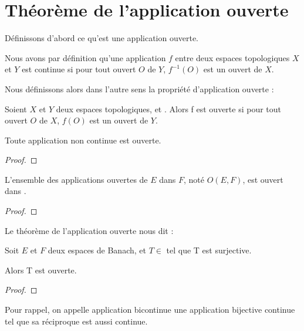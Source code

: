 \chapter{Théorème de l'application ouverte}

Définissons d'abord ce qu'est une application ouverte.

Nous avons par définition qu'une application $f$ entre deux espaces topologiques
$X$ et $Y$ est continue si pour tout ouvert $O$ de $Y$, $f^{-1}(O)$ est un
ouvert de $X$.

Nous définissons alors dans l'autre sens la propriété d'application ouverte :

\begin{definition}
	Soient $X$ et $Y$ deux espaces topologiques, et . Alors
	f est ouverte si pour tout ouvert $O$ de $X$, $f(O)$ est un ouvert de $Y$.
\end{definition}

\begin{proposition}
	Toute application non continue est ouverte.
\end{proposition}

\begin{proof}
	
\end{proof}

\begin{proposition}
	L'ensemble des applications ouvertes de $E$ dans $F$, noté $O(E, F)$, est
	ouvert dans .
\end{proposition}

\begin{proof}
	
\end{proof}

Le théorème de l'application ouverte nous dit :

\begin{theorem} 
	Soit $E$ et $F$ deux espaces de Banach, et $T \in$  tel
	que T est surjective.

	Alors T est ouverte.
	\label{open-application-theorem}
\end{theorem}

\begin{proof}
	
\end{proof}

Pour rappel, on appelle application bicontinue une application bijective
continue tel que sa réciproque est aussi continue.

